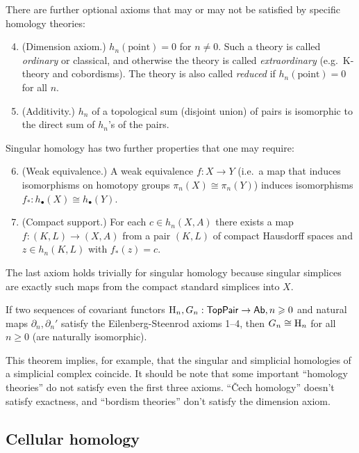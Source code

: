 There are further optional axioms that may or may not be satisfied by specific homology theories:
\begin{enumerate}
    \setcounter{enumi}{3}
    \item (Dimension axiom.) $h_n(\text{point})=0$ for $n\neq 0$. Such a theory is called \emph{ordinary} or classical, and otherwise the theory is called \emph{extraordinary} (e.g.\ K-theory and cobordisms). The theory is also called \emph{reduced} if $h_n(\text{point})=0$ for all $n$.
    \item (Additivity.) $h_n$ of a topological sum (disjoint union) of pairs is isomorphic to the direct sum of $h_n$'s of the pairs.
\end{enumerate}
Singular homology has two further properties that one may require:
\begin{enumerate}
    \setcounter{enumi}{5}
     \item (Weak equivalence.) A weak equivalence $f:X\to Y$ (i.e.\ a map that induces isomorphisms on homotopy groups $\pi_n(X)\cong \pi_n(Y)$) induces isomorphisms $f_\ast:h_\bullet(X)\cong h_\bullet(Y)$.
    \item (Compact support.)  For each $c\in h_n(X,A)$ there exists a map $f:(K,L)\to (X,A)$ from a pair $(K,L)$ of compact Hausdorff spaces and $z\in h_n(K,L)$ with $f_\ast(z)=c$.
\end{enumerate}   

The last axiom holds trivially for singular homology because singular simplices are exactly such maps from the compact standard simplices into $X$.


\begin{thm}
    If two sequences of covariant functors $\mathrm{H}_n,G_n:\mathsf{TopPair}\to \mathsf{Ab}, n\geqslant 0$ and natural maps $\partial_n,\partial_n '$ satisfy the Eilenberg-Steenrod axioms 1--4, then $G_n\cong \mathrm{H}_n$ for all $n\geq 0$ (are naturally isomorphic).
\end{thm}

 This theorem implies, for example, that the singular and simplicial homologies of a simplicial complex coincide. It should be note that some important ``homology theories'' do not satisfy even the first three axioms. ``\v Cech homology'' doesn't satisfy exactness, and ``bordism theories'' don't satisfy the dimension axiom.


\subsection{Cellular homology}

